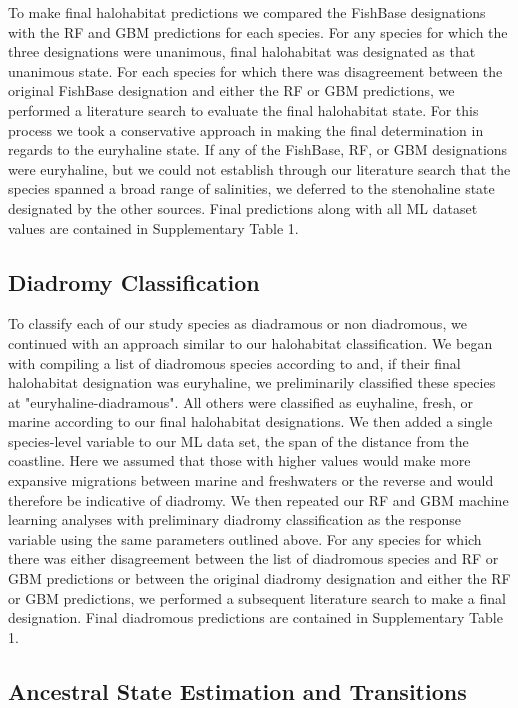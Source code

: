 \documentclass[11pt]{article}
\begin{document}
To make final halohabitat predictions we compared the FishBase designations with the RF and GBM predictions for each species. For any species for which the three designations were unanimous, final halohabitat was designated as that unanimous state. For each species for which there was disagreement between the original FishBase designation and either the RF or GBM predictions, we performed a literature search to evaluate the final halohabitat state. For this process we took a conservative approach in making the final determination in regards to the euryhaline state. If any of the FishBase, RF, or GBM designations were euryhaline, but we could not establish through our literature search that the species spanned a broad range of salinities, we deferred to the stenohaline state designated by the other sources. Final predictions along with all ML dataset values are contained in Supplementary Table 1.

\subsection*{Diadromy Classification}

To classify each of our study species as diadramous or non diadromous, we continued with an approach similar to our halohabitat classification. We began with compiling a list of diadromous species according to \cite{corush2019evolutionary} and, if their final halohabitat designation was euryhaline, we preliminarily classified these species at "euryhaline-diadramous". All others were classified as euyhaline, fresh, or marine according to our final halohabitat designations. We then added a single species-level variable to our ML data set, the span of the distance from the coastline. Here we assumed that those with higher values would make more expansive migrations between marine and freshwaters or the reverse and would therefore be indicative of diadromy. We then repeated our RF and GBM machine learning analyses with preliminary diadromy classification as the response variable using the same parameters outlined above.  For any species for which there was either disagreement between the \cite{corush2019evolutionary} list of diadromous species and RF or GBM predictions or between the original diadromy designation and either the RF or GBM predictions, we performed a subsequent literature search to make a final designation.  Final diadromous predictions are contained in Supplementary Table 1.


\subsection*{Ancestral State Estimation and Transitions }
\end{document}
